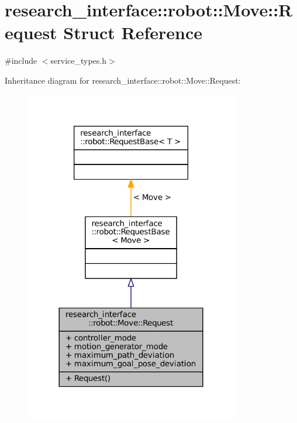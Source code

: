 \hypertarget{structresearch__interface_1_1robot_1_1Move_1_1Request}{}\section{research\+\_\+interface\+:\+:robot\+:\+:Move\+:\+:Request Struct Reference}
\label{structresearch__interface_1_1robot_1_1Move_1_1Request}


{\ttfamily \#include $<$service\+\_\+types.\+h$>$}



Inheritance diagram for research\+\_\+interface\+:\+:robot\+:\+:Move\+:\+:Request\+:
\nopagebreak
\begin{figure}[H]
\begin{center}
\leavevmode
\includegraphics[width=264pt]{structresearch__interface_1_1robot_1_1Move_1_1Request__inherit__graph}
\end{center}
\end{figure}


